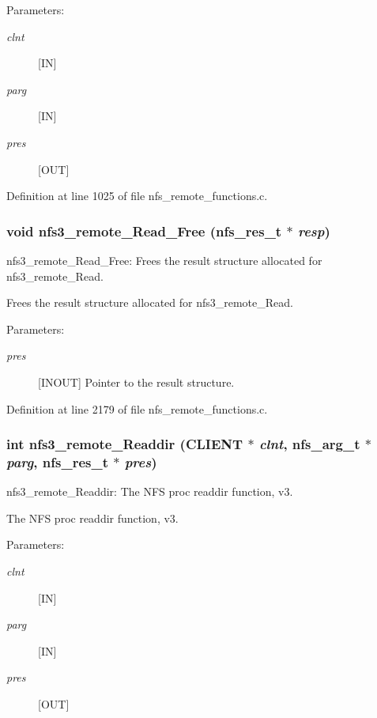 \begin{Desc}
\item[Parameters:]
\begin{description}
\item[{\em clnt}][IN] \item[{\em parg}][IN] \item[{\em pres}][OUT] \end{description}
\end{Desc}


Definition at line 1025 of file nfs\_\-remote\_\-functions.c.
\subsubsection{\setlength{\rightskip}{0pt plus 5cm}void nfs3\_\-remote\_\-Read\_\-Free (nfs\_\-res\_\-t $\ast$ {\em resp})}\label{group__NFSprocs_ga93}


nfs3\_\-remote\_\-Read\_\-Free: Frees the result structure allocated for nfs3\_\-remote\_\-Read.

Frees the result structure allocated for nfs3\_\-remote\_\-Read.

\begin{Desc}
\item[Parameters:]
\begin{description}
\item[{\em pres}][INOUT] Pointer to the result structure. \end{description}
\end{Desc}


Definition at line 2179 of file nfs\_\-remote\_\-functions.c.
\subsubsection{\setlength{\rightskip}{0pt plus 5cm}int nfs3\_\-remote\_\-Readdir (CLIENT $\ast$ {\em clnt}, nfs\_\-arg\_\-t $\ast$ {\em parg}, nfs\_\-res\_\-t $\ast$ {\em pres})}\label{group__NFSprocs_ga32}


nfs3\_\-remote\_\-Readdir: The NFS proc readdir function, v3.

The NFS proc readdir function, v3.

\begin{Desc}
\item[Parameters:]
\begin{description}
\item[{\em clnt}][IN] \item[{\em parg}][IN] \item[{\em pres}][OUT] \end{description}
\end{Desc}


